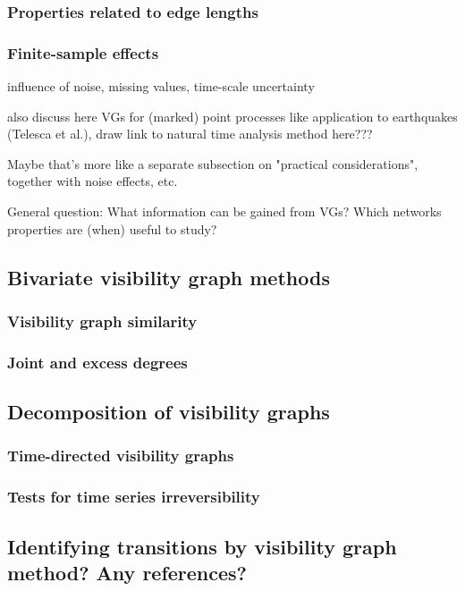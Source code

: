 		\subsubsection{Properties related to edge lengths}
		\subsubsection{Finite-sample effects}

influence of noise, missing values, time-scale uncertainty

also discuss here VGs for (marked) point processes like application to
earthquakes (Telesca et al.), draw link to natural time analysis method here???   

Maybe that's more like a separate subsection on "practical considerations",
together with noise effects, etc.

General question: What information can be gained from VGs? Which networks
properties are (when) useful to study? 

	\subsection{Bivariate visibility graph methods}
		\subsubsection{Visibility graph similarity}
		\subsubsection{Joint and excess degrees}


	\subsection{Decomposition of visibility graphs}
		\subsubsection{Time-directed visibility graphs}
		\subsubsection{Tests for time series irreversibility}
	\subsection{{\color{red} Identifying transitions by visibility graph method?
	Any references?}}
